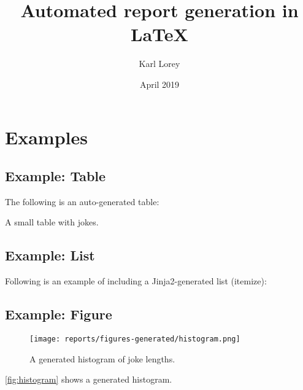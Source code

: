 \documentclass[11pt,a4paper]{report}
\begin{document}
\title{Automated report generation in LaTeX}
\author{Karl Lorey}
\date{April 2019}
\maketitle

\chapter{Examples}

\section{Example: Table}
The following is an auto-generated table:
\begin{table}[h]
\centering
{\small

}
\caption{A small table with jokes.}
\end{table}

\section{Example: List}
Following is an example of including a Jinja2-generated list (itemize):


\section{Example: Figure}
\begin{figure}
\centering
\texttt{[image: reports/figures-generated/histogram.png]}
\caption{A generated histogram of joke lengths.}
\label{fig:histogram}
\end{figure}

\autoref{fig:histogram} shows a generated histogram.
\end{document}
